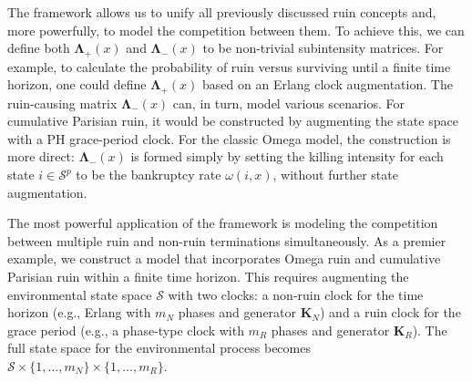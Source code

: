 \documentclass[11pt]{article}
\numberwithin{table}{section}
\numberwithin{figure}{section}
\numberwithin{equation}{section}
\newcommand{\1}{{\mathbf 1}}
\newcommand{\0}{\mat{0}}
\begin{document}
The framework allows us to unify all previously discussed ruin concepts and, more powerfully, to model the competition between them. To achieve this, we can define both \(\bm{\Lambda}_+(x)\) and \(\bm{\Lambda}_-(x)\) to be non-trivial subintensity matrices. For example, to calculate the probability of ruin versus surviving until a finite time horizon, one could define \(\bm{\Lambda}_+(x)\) based on an Erlang clock augmentation. The ruin-causing matrix \(\bm{\Lambda}_-(x)\) can, in turn, model various scenarios. For cumulative Parisian ruin, it would be constructed by augmenting the state space with a PH grace-period clock. For the classic Omega model, the construction is more direct: \(\bm{\Lambda}_-(x)\) is formed simply by setting the killing intensity for each state \(i \in \mathcal{S}^p\) to be the bankruptcy rate \(\omega(i,x)\), without further state augmentation.

The most powerful application of the framework is modeling the competition between multiple ruin and non-ruin terminations simultaneously. As a premier example, we construct a model that incorporates Omega ruin and cumulative Parisian ruin within a finite time horizon. This requires augmenting the environmental state space \(\mathcal{S}\) with two clocks: a non-ruin clock for the time horizon (e.g., Erlang with \(m_N\) phases and generator \(\bm{K}_N\)) and a ruin clock for the grace period (e.g., a phase-type clock with \(m_R\) phases and generator \(\bm{K}_R\)). The full state space for the environmental process becomes \(\mathcal{S} \times \{1, \dots, m_N\} \times \{1, \dots, m_R\}\).
\end{document}
